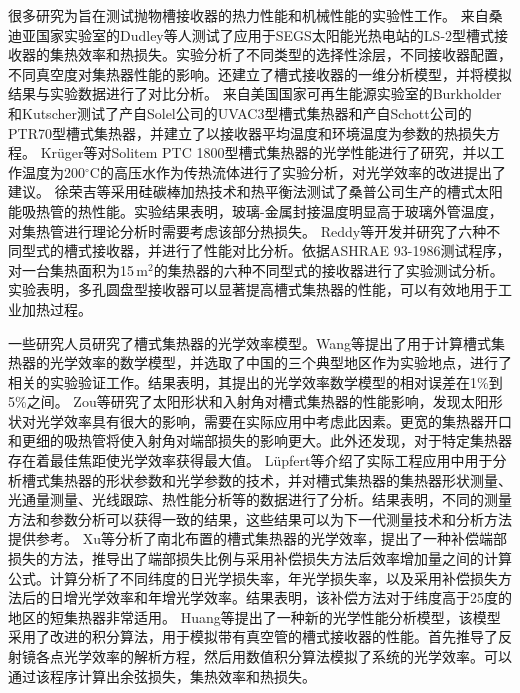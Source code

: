 很多研究为旨在测试抛物槽接收器的热力性能和机械性能的实验性工作。
来自桑迪亚国家实验室的Dudley等人\cite{Dudley1994}测试了应用于SEGS太阳能光热电站的LS-2型槽式接收器的集热效率和热损失。实验分析了不同类型的选择性涂层，不同接收器配置，不同真空度对集热器性能的影响。还建立了槽式接收器的一维分析模型，并将模拟结果与实验数据进行了对比分析。
来自美国国家可再生能源实验室的Burkholder和Kutscher\cite{Burkholder2009}测试了产自Solel公司的UVAC3型槽式集热器和产自Schott公司的PTR70型槽式集热器，并建立了以接收器平均温度和环境温度为参数的热损失方程。
Kr\"uger等\cite{Kruger2008}对Solitem PTC 1800型槽式集热器的光学性能进行了研究，并以工作温度为200$^\circ\mathrm{C}$的高压水作为传热流体进行了实验分析，对光学效率的改进提出了建议。
徐荣吉等\cite{Xu2012a}采用硅碳棒加热技术和热平衡法测试了桑普公司生产的槽式太阳能吸热管的热性能。实验结果表明，玻璃-金属封接温度明显高于玻璃外管温度，对集热管进行理论分析时需要考虑该部分热损失。
Reddy等\cite{Reddy2015b}开发并研究了六种不同型式的槽式接收器，并进行了性能对比分析。依据ASHRAE 93-1986测试程序，对一台集热面积为15$\,\mathrm{m^2}$的集热器的六种不同型式的接收器进行了实验测试分析。实验表明，多孔圆盘型接收器可以显著提高槽式集热器的性能，可以有效地用于工业加热过程。

一些研究人员研究了槽式集热器的光学效率模型。Wang等\cite{Wang2016}提出了用于计算槽式集热器的光学效率的数学模型，并选取了中国的三个典型地区作为实验地点，进行了相关的实验验证工作。结果表明，其提出的光学效率数学模型的相对误差在1\%到5\%之间。
Zou等\cite{Zou2017}研究了太阳形状和入射角对槽式集热器的性能影响，发现太阳形状对光学效率具有很大的影响，需要在实际应用中考虑此因素。更宽的集热器开口和更细的吸热管将使入射角对端部损失的影响更大。此外还发现，对于特定集热器存在着最佳焦距使光学效率获得最大值。
L\"upfert等\cite{Lupfert2006}介绍了实际工程应用中用于分析槽式集热器的形状参数和光学参数的技术，并对槽式集热器的集热器形状测量、光通量测量、光线跟踪、热性能分析等的数据进行了分析。结果表明，不同的测量方法和参数分析可以获得一致的结果，这些结果可以为下一代测量技术和分析方法提供参考。
Xu等\cite{Xu2014}分析了南北布置的槽式集热器的光学效率，提出了一种补偿端部损失的方法，推导出了端部损失比例与采用补偿损失方法后效率增加量之间的计算公式。计算分析了不同纬度的日光学损失率，年光学损失率，以及采用补偿损失方法后的日增光学效率和年增光学效率。结果表明，该补偿方法对于纬度高于25度的地区的短集热器非常适用。
Huang等\cite{Huang2012}提出了一种新的光学性能分析模型，该模型采用了改进的积分算法，用于模拟带有真空管的槽式接收器的性能。首先推导了反射镜各点光学效率的解析方程，然后用数值积分算法模拟了系统的光学效率。可以通过该程序计算出余弦损失，集热效率和热损失。

